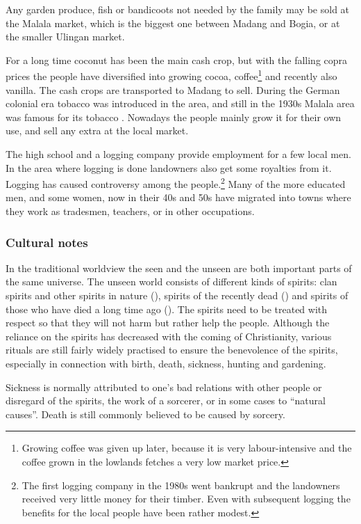 Any garden produce, fish or bandicoots not needed by the family may be sold at the Malala market, which is the biggest one between Madang and Bogia, or at the smaller Ulingan market.  

For a long time coconut has been the main cash crop, but with the falling copra prices the people have diversified into growing cocoa, coffee\footnote{Growing coffee was given up later, because it is very labour-intensive and the  coffee grown in the lowlands fetches a very low market price.} and recently also vanilla.  The cash crops are transported to Madang to sell.  During the German colonial era tobacco was introduced in the area, and still in the 1930s Malala area was famous for its tobacco \citep[454]{Tranel1952}. Nowadays the people mainly grow it for their own use, and sell any extra at the local market.

The high school and a logging company provide employment for a few local men.  In the area where logging is done landowners also get some royalties from it.  Logging has caused controversy among the people.\footnote{The first logging company in the 1980s went bankrupt and the landowners received very little money for their timber.  Even with subsequent logging the benefits for the local people have been rather modest.} Many of the more educated men, and some women, now in their 40s and 50s have migrated into towns where they work as tradesmen, teachers, or in other occupations. 

\subsubsection{Cultural notes} 
\hypertarget{RefHeading18521935131865}{}In the traditional worldview the seen and the unseen are both important parts of the same universe.  The unseen world consists of different kinds of spirits: clan spirits and other spirits in nature (), spirits of the recently dead () and spirits of those who have died a long time ago (). The spirits need to be treated with respect so that they will not harm but rather help the people.  Although the reliance on the spirits has decreased with the coming of Christianity, various rituals are still fairly widely practised to ensure the benevolence of the spirits, especially in connection with birth, death, sickness, hunting and gardening. 

Sickness is normally attributed to one's bad relations with other people or disregard of the spirits, the work of a sorcerer, or in some cases to ``natural causes''. Death is still commonly believed to be caused by sorcery.

